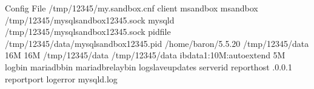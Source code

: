 \documentclass[letterpaper,10pt,english]{sphinxmanual}
\begin{document}
\begin{sphinxVerbatim}[commandchars=\\\{\}]
              Config File  /tmp/12345/my.sandbox.cnf
\PYG{o}{[}client\PYG{o}{]}
                                 msandbox
                             msandbox
                                 
                               /tmp/12345/mysql\PYGZus{}sandbox12345.sock
\PYG{o}{[}mysqld\PYG{o}{]}
                                 
                               /tmp/12345/mysql\PYGZus{}sandbox12345.sock
pid\PYGZhy{}file                             /tmp/12345/data/mysql\PYGZus{}sandbox12345.pid
                              /home/baron/5.5.20
                              /tmp/12345/data
                      16M
              16M
                 /tmp/12345/data
            /tmp/12345/data
                ibdata1:10M:autoextend
                 5M
log\PYGZhy{}bin                              mariadb\PYGZhy{}bin
                            mariadb\PYGZhy{}relay\PYGZhy{}bin
log\PYGZus{}slave\PYGZus{}updates
server\PYGZhy{}id                            
report\PYGZhy{}host                          .0.0.1
report\PYGZhy{}port                          
log\PYGZhy{}error                            mysqld.log
             
\end{sphinxVerbatim}
\end{document}
